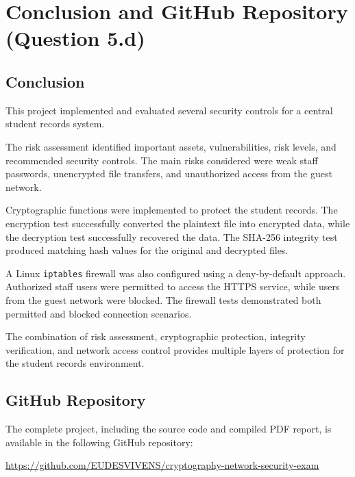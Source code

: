 \documentclass[12pt,a4paper]{article}
\begin{document}

\newpage

\section{Conclusion and GitHub Repository (Question 5.d)}

\subsection{Conclusion}

This project implemented and evaluated several security controls for a central student records system.

The risk assessment identified important assets, vulnerabilities, risk levels, and recommended security controls. The main risks considered were weak staff passwords, unencrypted file transfers, and unauthorized access from the guest network.

Cryptographic functions were implemented to protect the student records. The encryption test successfully converted the plaintext file into encrypted data, while the decryption test successfully recovered the data. The SHA-256 integrity test produced matching hash values for the original and decrypted files.

A Linux \texttt{iptables} firewall was also configured using a deny-by-default approach. Authorized staff users were permitted to access the HTTPS service, while users from the guest network were blocked. The firewall tests demonstrated both permitted and blocked connection scenarios.

The combination of risk assessment, cryptographic protection, integrity verification, and network access control provides multiple layers of protection for the student records environment.

\subsection{GitHub Repository}

The complete project, including the source code and compiled PDF report, is available in the following GitHub repository:

\begin{center}
\url{https://github.com/EUDESVIVENS/cryptography-network-security-exam}
\end{center}

\end{document}

